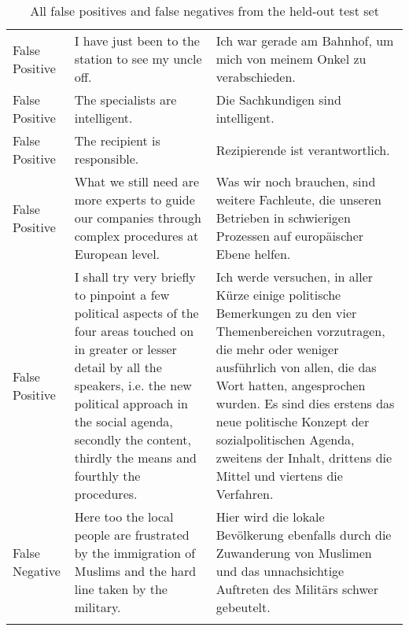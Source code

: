 \begin{longtable}{|l|p{6cm}|p{6cm}|}
False Positive & I have just been to the station to see my uncle off. & Ich war gerade am Bahnhof, um mich von meinem Onkel zu verabschieden. \\
False Positive & The specialists are intelligent. & Die Sachkundigen sind intelligent. \\
False Positive & The recipient is responsible. & Rezipierende ist verantwortlich. \\
False Positive & What we still need are more experts to guide our companies through complex procedures at European level. & Was wir noch brauchen, sind weitere Fachleute, die unseren Betrieben in schwierigen Prozessen auf europäischer Ebene helfen. \\
False Positive & I shall try very briefly to pinpoint a few political aspects of the four areas touched on in greater or lesser detail by all the speakers, i.e. the new political approach in the social agenda, secondly the content, thirdly the means and fourthly the procedures. & Ich werde versuchen, in aller Kürze einige politische Bemerkungen zu den vier Themenbereichen vorzutragen, die mehr oder weniger ausführlich von allen, die das Wort hatten, angesprochen wurden. Es sind dies erstens das neue politische Konzept der sozialpolitischen Agenda, zweitens der Inhalt, drittens die Mittel und viertens die Verfahren. \\
False Negative & Here too the local people are frustrated by the immigration of Muslims and the hard line taken by the military. & Hier wird die lokale Bevölkerung ebenfalls durch die Zuwanderung von Muslimen und das unnachsichtige Auftreten des Militärs schwer gebeutelt. \\
\hline
\caption{All false positives and false negatives from the held-out test set}
\end{longtable}
